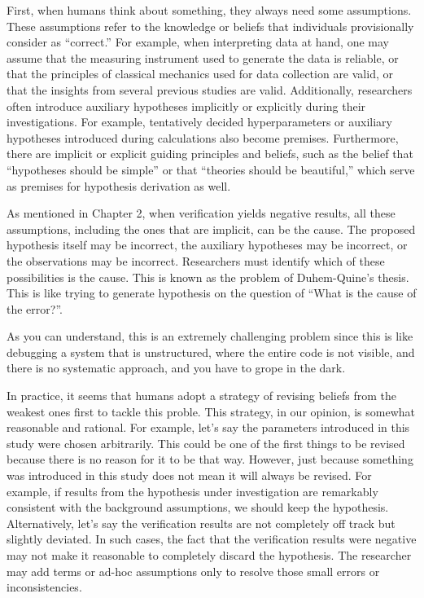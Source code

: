 \documentclass{book}
\begin{document}
First, when humans think about something, they always need some assumptions. These assumptions refer to the knowledge or beliefs that individuals provisionally consider as ``correct.'' For example, when interpreting data at hand, one may assume that the measuring instrument used to generate the data is reliable, or that the principles of classical mechanics used for data collection are valid, or that the insights from several previous studies are valid. Additionally, researchers often introduce auxiliary hypotheses implicitly or explicitly during their investigations. For example, tentatively decided hyperparameters or auxiliary hypotheses introduced during calculations also become premises. Furthermore, there are implicit or explicit guiding principles and beliefs, such as the belief that ``hypotheses should be simple'' or that ``theories should be beautiful,'' which serve as premises for hypothesis derivation as well.

As mentioned in Chapter 2, when verification yields negative results, all these assumptions, including the ones that are implicit, can be the cause. The proposed hypothesis itself may be incorrect, the auxiliary hypotheses may be incorrect, or the observations may be incorrect. Researchers must identify which of these possibilities is the cause. This is known as the problem of Duhem-Quine's thesis. This is like trying to generate hypothesis on the question of ``What is the cause of the error?''. 

As you can understand, this is an extremely challenging problem since this is like debugging a system that is unstructured, where the entire code is not visible, and there is no systematic approach, and you have to grope in the dark. 

In practice, it seems that humans adopt a strategy of revising beliefs from the weakest ones first to tackle this proble. This strategy, in our opinion, is somewhat reasonable and rational. For example, let's say the parameters introduced in this study were chosen arbitrarily. This could be one of the first things to be revised because there is no reason for it to be that way. However, just because something was introduced in this study does not mean it will always be revised. For example, if results from the hypothesis under investigation are remarkably consistent with the background assumptions, we should keep the hypothesis. Alternatively, let's say the verification results are not completely off track but slightly deviated. In such cases, the fact that the verification results were negative may not make it reasonable to completely discard the hypothesis. The researcher may add terms or ad-hoc assumptions only to resolve those small errors or inconsistencies.
\end{document}
